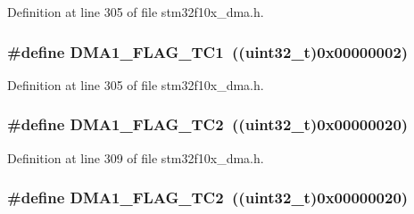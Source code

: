 Definition at line 305 of file stm32f10x\+\_\+dma.\+h.

\subsubsection[{\texorpdfstring{D\+M\+A1\+\_\+\+F\+L\+A\+G\+\_\+\+T\+C1}{DMA1_FLAG_TC1}}]{\setlength{\rightskip}{0pt plus 5cm}\#define D\+M\+A1\+\_\+\+F\+L\+A\+G\+\_\+\+T\+C1~(({\bf uint32\+\_\+t})0x00000002)}\hypertarget{group___d_m_a__flags__definition_gaa9b4d1112bcfd34136007b813a11187e}{}\label{group___d_m_a__flags__definition_gaa9b4d1112bcfd34136007b813a11187e}


Definition at line 305 of file stm32f10x\+\_\+dma.\+h.

\subsubsection[{\texorpdfstring{D\+M\+A1\+\_\+\+F\+L\+A\+G\+\_\+\+T\+C2}{DMA1_FLAG_TC2}}]{\setlength{\rightskip}{0pt plus 5cm}\#define D\+M\+A1\+\_\+\+F\+L\+A\+G\+\_\+\+T\+C2~(({\bf uint32\+\_\+t})0x00000020)}\hypertarget{group___d_m_a__flags__definition_ga0eff24f7e6b2b874328d531ee9315b20}{}\label{group___d_m_a__flags__definition_ga0eff24f7e6b2b874328d531ee9315b20}


Definition at line 309 of file stm32f10x\+\_\+dma.\+h.

\subsubsection[{\texorpdfstring{D\+M\+A1\+\_\+\+F\+L\+A\+G\+\_\+\+T\+C2}{DMA1_FLAG_TC2}}]{\setlength{\rightskip}{0pt plus 5cm}\#define D\+M\+A1\+\_\+\+F\+L\+A\+G\+\_\+\+T\+C2~(({\bf uint32\+\_\+t})0x00000020)}\hypertarget{group___d_m_a__flags__definition_ga0eff24f7e6b2b874328d531ee9315b20}{}\label{group___d_m_a__flags__definition_ga0eff24f7e6b2b874328d531ee9315b20}


